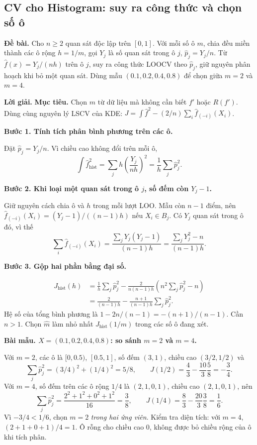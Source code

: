 \documentclass[11pt,a4paper]{article}
\newcommand{\buoc}[1]{\par\medskip\textbf{#1}\par}
\begin{document}
\subsection{CV cho Histogram: suy ra công thức và chọn số ô}\label{sec:hist-cv}
\textbf{Đề bài.} Cho $n\geq2$ quan sát độc lập trên $[0,1]$.
Với mỗi số ô $m$, chia đều miền thành các ô rộng $h=1/m$,
gọi $Y_j$ là số quan sát trong ô $j$, $\widehat p_j=Y_j/n$.
Từ $\widehat f(x)=Y_j/(nh)$ trên ô $j$, suy ra công thức LOOCV theo $\widehat p_j$,
giữ nguyên phân hoạch khi bỏ một quan sát.
Dùng mẫu $(0.1,0.2,0.4,0.8)$ để chọn giữa $m=2$ và $m=4$.

\textbf{Lời giải.}
\textbf{Mục tiêu.} Chọn $m$ từ dữ liệu mà không cần biết $f'$ hoặc $R(f')$. Dùng cùng nguyên lý LSCV của KDE: $J=\int\widehat f^2-(2/n)\sum_i\widehat f_{(-i)}(X_i)$.
\buoc{Bước 1. Tính tích phân bình phương trên các ô.}
Đặt $\widehat p_j=Y_j/n$. Vì chiều cao không đổi trên mỗi ô,
\[
\int\widehat f_{\mathrm{hist}}^2=\sum_jh\left(\frac{Y_j}{nh}\right)^2
=\frac1h\sum_j\widehat p_j^2.
\]
\buoc{Bước 2. Khi loại một quan sát trong ô $j$, số đếm còn $Y_j-1$.}
Giữ nguyên cách chia ô và $h$ trong mỗi lượt LOO. Mẫu còn $n-1$ điểm, nên
$\widehat f_{(-i)}(X_i)=(Y_j-1)/((n-1)h)$ nếu $X_i\in B_j$. Có $Y_j$ quan sát trong ô đó, vì thế
\[
\sum_i\widehat f_{(-i)}(X_i)=\frac{\sum_jY_j(Y_j-1)}{(n-1)h}
=\frac{\sum_jY_j^2-n}{(n-1)h}.
\]
\buoc{Bước 3. Gộp hai phần bằng đại số.}
\begin{align*}
J_{\mathrm{hist}}(h)
&=\frac1h\sum_j\widehat p_j^2
-\frac2{n(n-1)h}\left(n^2\sum_j\widehat p_j^2-n\right)\\
&=\boxed{\frac2{(n-1)h}-\frac{n+1}{(n-1)h}\sum_j\widehat p_j^2}.
\end{align*}
Hệ số của tổng bình phương là $1-2n/(n-1)=-(n+1)/(n-1)$. Cần $n>1$. Chọn $\widehat m$ làm nhỏ nhất $J_{\mathrm{hist}}(1/m)$ trong các số ô đang xét.

\buoc{Bài mẫu. $X=(0.1,0.2,0.4,0.8)$: so sánh $m=2$ và $m=4$.}
Với $m=2$, các ô là $[0,0.5)$, $[0.5,1]$, số đếm $(3,1)$, chiều cao $(3/2,1/2)$ và
\[
\sum_j\widehat p_j^2=(3/4)^2+(1/4)^2=5/8,
\qquad J(1/2)=\frac43-\frac{10}3\frac58=\boxed{-\frac34}.
\]
Với $m=4$, số đếm trên các ô rộng $1/4$ là $(2,1,0,1)$, chiều cao $(2,1,0,1)$, nên
\[
\sum_j\widehat p_j^2=\frac{2^2+1^2+0^2+1^2}{16}=\frac38,
\qquad J(1/4)=\frac83-\frac{20}3\frac38=\boxed{\frac16}.
\]
Vì $-3/4<1/6$, chọn $m=2$ \emph{trong hai ứng viên}. Kiểm tra diện tích: với $m=4$, $(2+1+0+1)/4=1$. Ô rỗng cho chiều cao 0, không được bỏ chiều rộng của ô khi tích phân.
\end{document}
